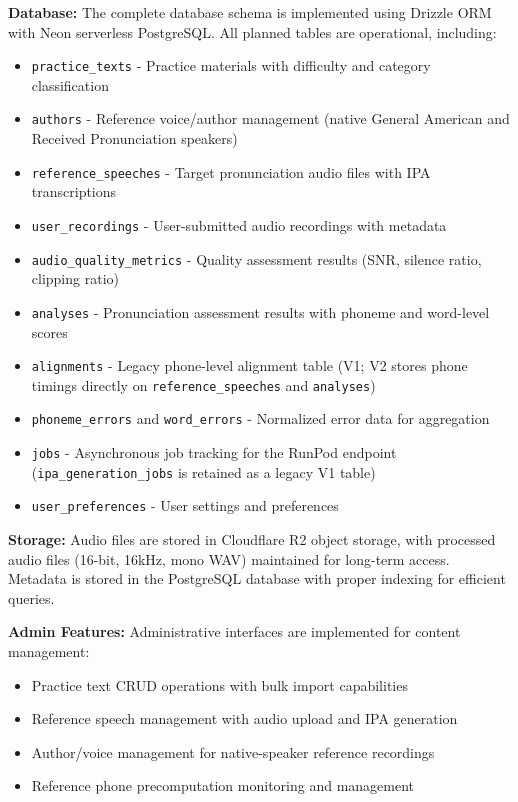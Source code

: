 \documentclass[a4paper,12pt]{report}
\begin{document}
\textbf{Database:} The complete database schema is implemented using Drizzle ORM with Neon serverless PostgreSQL. All planned tables are operational, including:
\begin{itemize}
    \item \texttt{practice\_texts} - Practice materials with difficulty and category classification
    \item \texttt{authors} - Reference voice/author management (native General American and Received Pronunciation speakers)
    \item \texttt{reference\_speeches} - Target pronunciation audio files with IPA transcriptions
    \item \texttt{user\_recordings} - User-submitted audio recordings with metadata
    \item \texttt{audio\_quality\_metrics} - Quality assessment results (SNR, silence ratio, clipping ratio)
    \item \texttt{analyses} - Pronunciation assessment results with phoneme and word-level scores
    \item \texttt{alignments} - Legacy phone-level alignment table (V1; V2 stores phone timings directly on \texttt{reference\_speeches} and \texttt{analyses})
    \item \texttt{phoneme\_errors} and \texttt{word\_errors} - Normalized error data for aggregation
    \item \texttt{jobs} - Asynchronous job tracking for the RunPod endpoint (\texttt{ipa\_generation\_jobs} is retained as a legacy V1 table)
    \item \texttt{user\_preferences} - User settings and preferences
\end{itemize}

\textbf{Storage:} Audio files are stored in Cloudflare R2 object storage, with processed audio files (16-bit, 16kHz, mono WAV) maintained for long-term access. Metadata is stored in the PostgreSQL database with proper indexing for efficient queries.

\textbf{Admin Features:} Administrative interfaces are implemented for content management:
\begin{itemize}
    \item Practice text CRUD operations with bulk import capabilities
    \item Reference speech management with audio upload and IPA generation
    \item Author/voice management for native-speaker reference recordings
    \item Reference phone precomputation monitoring and management
\end{itemize}
\end{document}
